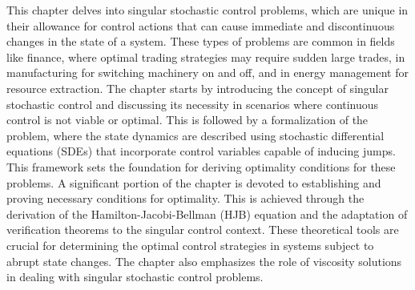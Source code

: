 \documentclass[12pt,a4paper,oneside]{book}
\numberwithin{theorem}{section}
\numberwithin{definition}{section}
\numberwithin{example}{section}
\numberwithin{exercise}{section}
\begin{document}
This chapter delves into singular stochastic control problems, which are unique in their allowance for control actions that can cause immediate and discontinuous changes in the state of a system. These types of problems are common in fields like finance, where optimal trading strategies may require sudden large trades, in manufacturing for switching machinery on and off, and in energy management for resource extraction. The chapter starts by introducing the concept of singular stochastic control and discussing its necessity in scenarios where continuous control is not viable or optimal. This is followed by a formalization of the problem, where the state dynamics are described using stochastic differential equations (SDEs) that incorporate control variables capable of inducing jumps. This framework sets the foundation for deriving optimality conditions for these problems. A significant portion of the chapter is devoted to establishing and proving necessary conditions for optimality. This is achieved through the derivation of the Hamilton-Jacobi-Bellman (HJB) equation and the adaptation of verification theorems to the singular control context. These theoretical tools are crucial for determining the optimal control strategies in systems subject to abrupt state changes. The chapter also emphasizes the role of viscosity solutions in dealing with singular stochastic control problems. 

% 



\nocite{*}
\printbibliography
{}

\end{document}
